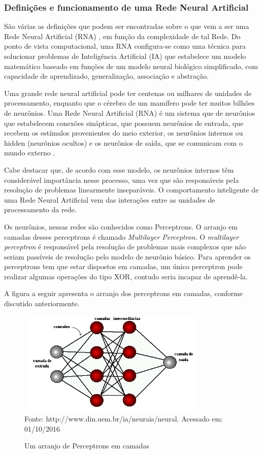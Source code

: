 \subsubsection{Definições e funcionamento de uma Rede Neural Artificial}

São várias as definições que podem ser encontradas sobre o que vem a ser uma Rede Neural Artificial (RNA) \cite{Castanheira}, em função da complexidade de tal Rede. 
Do ponto de vista computacional, uma RNA configura-se como uma técnica para solucionar problemas de Inteligência Artificial (IA) que estabelece um modelo matemático 
baseado em funções de um modelo neural biológico simplificado, com capacidade de aprendizado, generalização, associação e abstração.

Uma grande rede neural artificial pode ter centenas ou milhares de unidades de processamento, enquanto que o cérebro de um mamífero pode ter muitos bilhões de neurônios. 
Uma Rede Neural Artificial (RNA) é um sistema que de neurônios que estabelecem conexões sinápticas, que possuem neurônios de entrada, que recebem os estímulos provenientes 
do meio exterior, os neurônios internos ou hidden (neurônios ocultos) e os neurônios de saída, que se comunicam com o mundo externo \cite{Tatibana}.

Cabe destacar que, de acordo com esse modelo, os neurônios internos têm considerável importância nesse processo, uma vez que são responsáveis pela resolução de problemas linearmente inseparáveis. 
O comportamento inteligente de uma Rede Neural Artificial vem das interações entre as unidades de processamento da rede.

Os neurônios, nessas redes são conhecidos como Perceptrons. O arranjo em camadas desses perceptrons é chamado \textit{Multilayer Perceptron}.
O \textit{multilayer perceptron} é responsável pela resolução de problemas mais complexos que não seriam passíveis de resolução pelo modelo 
de neurônio básico. Para aprender os perceptrons tem que estar dispostos em camadas, um único perceptron pode realizar algumas operações do 
tipo XOR, contudo seria incapaz de aprendê-la.

A figura a seguir apresenta o arranjo dos perceptrons em camadas, conforme discutido anteriormente.
\pagebreak

\begin{figure}[!ht]
\centering
\caption{Um arranjo de Perceptrons em camadas}
\vspace{1mm}
\includegraphics[width=90mm, height=50mm]{Figuras/Neural/camdasIntermediarias.png}\\
\tiny Fonte: http://www.din.uem.br/ia/neurais/neural. Acessado em: 01/10/2016
\end{figure}

